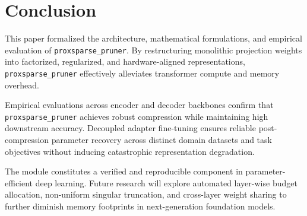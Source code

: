 \section{Conclusion}
This paper formalized the architecture, mathematical formulations, and empirical evaluation of \texttt{proxsparse\_pruner}. By restructuring monolithic projection weights into factorized, regularized, and hardware-aligned representations, \texttt{proxsparse\_pruner} effectively alleviates transformer compute and memory overhead.

Empirical evaluations across encoder and decoder backbones confirm that \texttt{proxsparse\_pruner} achieves robust compression while maintaining high downstream accuracy. Decoupled adapter fine-tuning ensures reliable post-compression parameter recovery across distinct domain datasets and task objectives without inducing catastrophic representation degradation.

The module constitutes a verified and reproducible component in parameter-efficient deep learning. Future research will explore automated layer-wise budget allocation, non-uniform singular truncation, and cross-layer weight sharing to further diminish memory footprints in next-generation foundation models.
